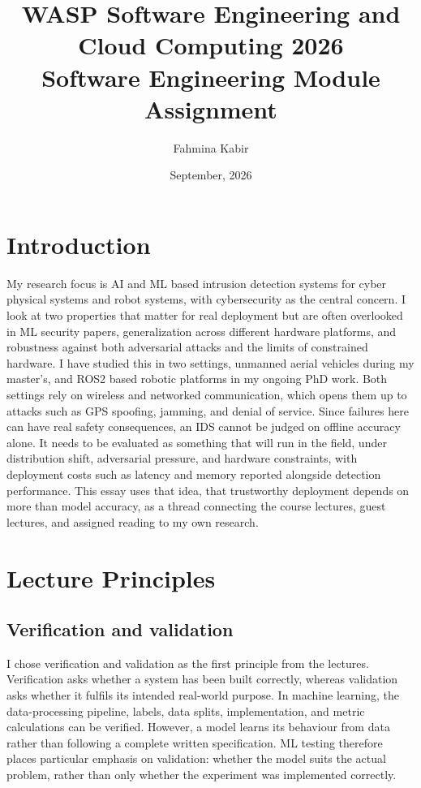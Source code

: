 \documentclass[11pt,a4paper]{article}
\title{WASP Software Engineering and Cloud Computing 2026\\Software Engineering Module Assignment}
\date{September, 2026}
\author{Fahmina Kabir}
\begin{document}
\maketitle

\section{Introduction}

My research focus is AI and ML based intrusion detection systems for cyber physical systems and robot systems, with cybersecurity as the central concern. I look at two properties that matter for real deployment but are often overlooked in ML security papers, generalization across different hardware platforms, and robustness against both adversarial attacks and the limits of constrained hardware. I have studied this in two settings, unmanned aerial vehicles during my master's, and ROS2 based robotic platforms in my ongoing PhD work. Both settings rely on wireless and networked communication, which opens them up to attacks such as GPS spoofing, jamming, and denial of service. Since failures here can have real safety consequences, an IDS cannot be judged on offline accuracy alone. It needs to be evaluated as something that will run in the field, under distribution shift, adversarial pressure, and hardware constraints, with deployment costs such as latency and memory reported alongside detection performance. This essay uses that idea, that trustworthy deployment depends on more than model accuracy, as a thread connecting the course lectures, guest lectures, and assigned reading to my own research.

\section{Lecture Principles}

\subsection{Verification and validation}

I chose verification and validation as the first principle from the lectures. Verification asks whether a system has been built correctly, whereas validation asks whether it fulfils its intended real-world purpose. In machine learning, the data-processing pipeline, labels, data splits, implementation, and metric calculations can be verified. However, a model learns its behaviour from data rather than following a complete written specification. ML testing therefore places particular emphasis on validation: whether the model suits the actual problem, rather than only whether the experiment was implemented correctly.
\end{document}
